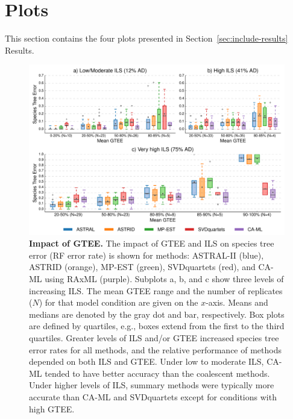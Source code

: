 \clearpage

\section{Plots}
\label{sec:include-plots}
This section contains the four plots presented in Section~\ref{sec:include-results} Results.

\vspace{12pt}

\begin{figure}[!h]
\centering
\includegraphics[width=1.0\textwidth]{figures/gene-filtering-fig1.pdf}
\caption{{\bf Impact of GTEE.} The impact of GTEE and ILS on species tree error (RF error rate) is shown for methods: ASTRAL-II (blue), ASTRID (orange), MP-EST (green), SVDquartets (red), and CA-ML using RAxML (purple). 
Subplots a, b, and c show three levels of increasing ILS. 
The mean GTEE range and the number of replicates ($N$) for that model condition are given on the $x$-axis. 
Means and medians are denoted by the gray dot and bar, respectively. Box plots are defined by quartiles, e.g., boxes extend from the first to the third quartiles. 
Greater levels of ILS and/or GTEE increased species tree error rates for all methods, and the relative performance of methods depended on both ILS and GTEE. 
Under low to moderate ILS, CA-ML tended to have better accuracy than the coalescent methods. 
Under higher levels of ILS, summary methods were typically more accurate than CA-ML and SVDquartets except for conditions with high GTEE.}
\label{fig:include-1}
\end{figure}

\afterpage{\clearpage}

